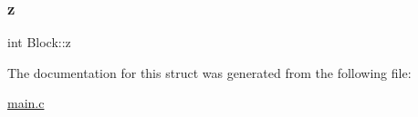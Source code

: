 \mbox{\label{structBlock_aeb6a2ee081d32a7c2e8f3ddcca235fc9}} 
\subsubsection{\texorpdfstring{z}{z}}
{\footnotesize\ttfamily int Block\+::z}



The documentation for this struct was generated from the following file\+:\begin{DoxyCompactItemize}
\item 
\hyperlink{main_8c}{main.\+c}\end{DoxyCompactItemize}
